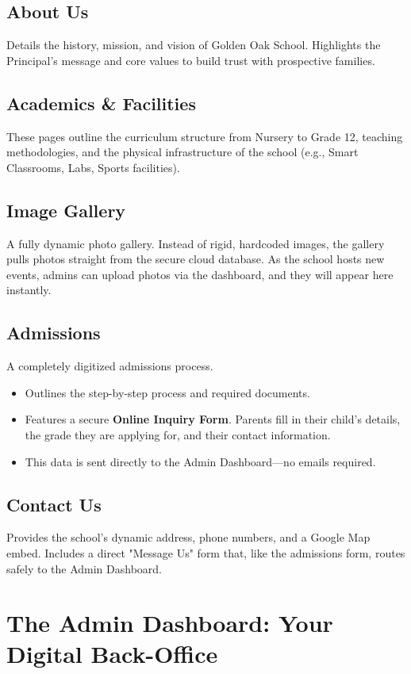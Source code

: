 \documentclass[11pt,a4paper]{article}
\begin{document}
\subsection{About Us}
Details the history, mission, and vision of Golden Oak School. Highlights the Principal's message and core values to build trust with prospective families.

\subsection{Academics \& Facilities}
These pages outline the curriculum structure from Nursery to Grade 12, teaching methodologies, and the physical infrastructure of the school (e.g., Smart Classrooms, Labs, Sports facilities). 

\subsection{Image Gallery}
A fully dynamic photo gallery. Instead of rigid, hardcoded images, the gallery pulls photos straight from the secure cloud database. As the school hosts new events, admins can upload photos via the dashboard, and they will appear here instantly.

\subsection{Admissions}
A completely digitized admissions process. 
\begin{itemize}
    \item Outlines the step-by-step process and required documents.
    \item Features a secure \textbf{Online Inquiry Form}. Parents fill in their child's details, the grade they are applying for, and their contact information. 
    \item This data is sent directly to the Admin Dashboard—no emails required.
\end{itemize}

\subsection{Contact Us}
Provides the school's dynamic address, phone numbers, and a Google Map embed. Includes a direct "Message Us" form that, like the admissions form, routes safely to the Admin Dashboard.

\section{The Admin Dashboard: Your Digital Back-Office}
\end{document}
